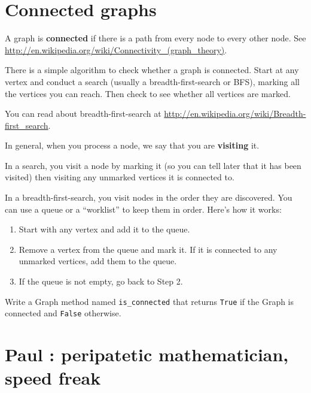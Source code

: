 \documentclass[10pt]{book}
\begin{document}
\section{Connected graphs}
\label{bfs}

A graph is {\bf connected} if there is a path from every node to every
other node.  See \url{http://en.wikipedia.org/wiki/Connectivity_(graph_theory)}.

There is a simple algorithm to check whether a graph is connected.
Start at any vertex and conduct a search
(usually a breadth-first-search or BFS), marking all the vertices you
can reach.  Then check to see whether all vertices are marked.

You can read about breadth-first-search at
\url{http://en.wikipedia.org/wiki/Breadth-first_search}.

In general, when you process
a node, we say that you are
{\bf visiting} it.

In a search, you visit a node
by marking it (so you can tell later that it has been visited)
then visiting any
unmarked vertices it is connected to.

In a breadth-first-search, you visit nodes in the order they are
discovered.  You can use a queue or a ``worklist'' to keep them in
order.  Here's how it works:

\begin{enumerate}

\item Start with any vertex and add it to the queue.

\item Remove a vertex from the queue and mark it.  If it is
connected to any unmarked vertices, add them to the queue.

\item If the queue is not empty, go back to Step 2.

\end{enumerate}

\begin{exercise}

Write a Graph method named \verb"is_connected" that returns
{\tt True} if the Graph is connected and {\tt False} otherwise.

\end{exercise}


\section{Paul \Erdos: peripatetic mathematician, speed freak}
\end{document}
